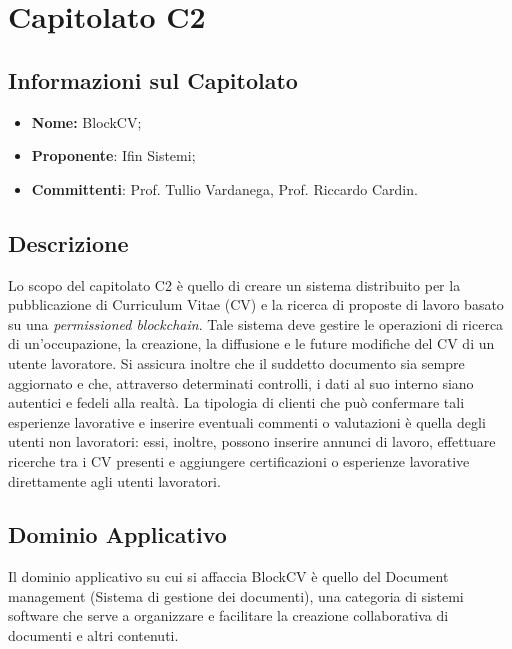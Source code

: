 \section{Capitolato C2}
\subsection{Informazioni sul Capitolato}
  \begin{itemize}
    \item \textbf{Nome:}
    BlockCV;
    \item \textbf{Proponente}:
    Ifin Sistemi;
    \item \textbf{Committenti}:
    Prof. Tullio Vardanega, Prof. Riccardo Cardin.
  \end{itemize}

\subsection{Descrizione}
  Lo scopo del capitolato C2 è quello di creare un sistema distribuito per la pubblicazione di Curriculum Vitae (CV) e la ricerca di proposte di lavoro basato su una \textit{permissioned blockchain}. Tale sistema deve gestire le operazioni di ricerca di un'occupazione, la creazione, la diffusione e le future modifiche del CV di un utente lavoratore. Si assicura inoltre che il suddetto documento sia sempre aggiornato e che, attraverso determinati controlli, i dati al suo interno siano autentici e fedeli alla realtà.
  \newline \newline La tipologia di clienti che può confermare tali esperienze lavorative e inserire eventuali commenti o valutazioni è quella degli utenti non lavoratori: essi, inoltre, possono inserire annunci di lavoro, effettuare ricerche tra i CV presenti e aggiungere certificazioni o esperienze lavorative direttamente agli utenti lavoratori.

\subsection{Dominio Applicativo}
  Il dominio applicativo su cui si affaccia BlockCV è quello del Document management (Sistema di gestione dei documenti), una categoria di sistemi software che serve a organizzare e facilitare la creazione collaborativa di documenti e altri contenuti.


